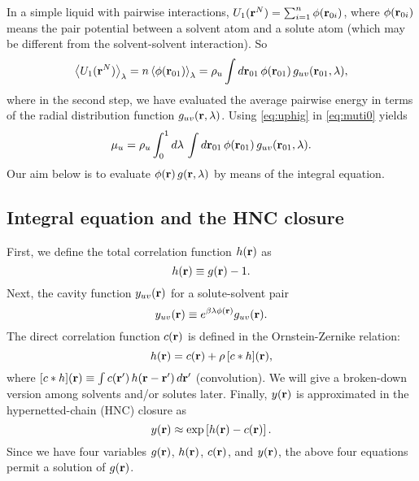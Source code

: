 \documentclass[12pt]{article}
\begin{document}
In a simple liquid with pairwise interactions,
  $U_1(\mathbf{r}^N) = \sum_{i = 1}^{n} \phi(\mathbf{r}_{0i})$,
  where $\phi(\mathbf{r}_{0i})$ means the pair potential
  between a solvent atom and a solute atom
  (which may be different from the solvent-solvent
  interaction).
So
\begin{equation}
    \left\langle
      U_1(\mathbf{r}^N)
    \right\rangle_\lambda
    =
    n
    \left\langle
      \phi(\mathbf{r}_{01})
    \right\rangle_\lambda
    =
    \rho_u \int d\mathbf{r}_{01} \,
      \phi(\mathbf{r}_{01}) \, g_{uv}(\mathbf{r}_{01}, \lambda),
  \label{eq:uphig}
\end{equation}
%
where in the second step, we have evaluated the average
pairwise energy in terms of the radial distribution function
$g_{uv}(\mathbf{r}, \lambda)$.
Using \eqref{eq:uphig} in \eqref{eq:muti0} yields
\begin{equation}
    \mu_u
    =
    \rho_u
    \int_0^1 d\lambda \,
      \int d\mathbf{r}_{01} \,
        \phi(\mathbf{r}_{01}) \, g_{uv}(\mathbf{r}_{01}, \lambda).
  \label{eq:muti}
\end{equation}
Our aim below is to evaluate
$\phi(\mathbf{r}) \, g(\mathbf{r}, \lambda)$
by means of the integral equation.



\subsection{\label{sec:funcs}Integral equation and the HNC closure}

First, we define the total correlation function $h(\mathbf{r})$ as
\begin{equation}
  h(\mathbf{r}) \equiv g(\mathbf{r}) - 1.
  \label{eq:hr}
\end{equation}
%
%
%
Next, the cavity function $y_{uv}(\mathbf{r})$ for a solute-solvent pair
\begin{equation}
  y_{uv}(\mathbf{r}) \equiv e^{ \beta \lambda \phi(\mathbf{r}) } g_{uv}(\mathbf{r}).
  \label{eq:yr}
\end{equation}
%
%
%
The direct correlation function $c(\mathbf{r})$
is defined in the Ornstein-Zernike relation:
\begin{equation}
  h(\mathbf{r}) = c(\mathbf{r}) + \rho \, [c * h](\mathbf{r}),
  \label{eq:cr}
\end{equation}
where $[c*h](\mathbf{r}) \equiv \int c(\mathbf{r}') \, h(\mathbf{r} - \mathbf{r}') \, d\mathbf{r}'$
  (convolution).
We will give a broken-down version among solvents and/or solutes later.
%
%
%
%
%
%
Finally, $y(\mathbf{r})$ is approximated in the hypernetted-chain (HNC) closure as
\begin{equation}
  y(\mathbf{r}) \approx \exp\left[ h(\mathbf{r}) - c(\mathbf{r}) \right].
  \label{eq:hnc}
\end{equation}
Since we have four variables
  $g(\mathbf{r})$, $h(\mathbf{r})$, $c(\mathbf{r})$, and $y(\mathbf{r})$,
the above four equations permit a solution of $g(\mathbf{r})$.
\end{document}
